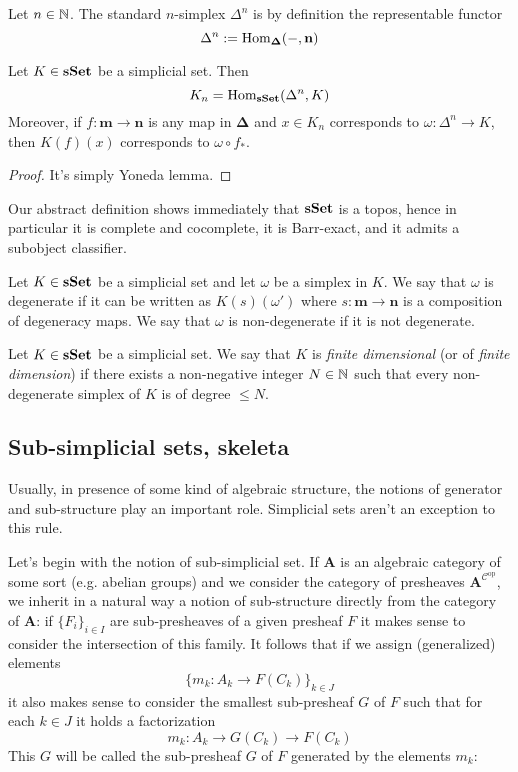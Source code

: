 \begin{defin}
Let $n \in \mathbb{N}$. The standard $n$-simplex $\Delta^n$ is by definition the representable functor
\[
\Delta^n := \mathrm{Hom}_{\mathbf \Delta}(-,\mathbf n)
\]
\end{defin}

\begin{prop} \label{prop simplicial morphisms with Yoneda identification}
Let $K \in \mathbf{sSet}$ be a simplicial set. Then
\[
K_n = \mathrm{Hom}_{\mathbf{sSet}}(\Delta^n,K)
\]
Moreover, if $f \colon \mathbf m \to \mathbf n$ is any map in $\mathbf \Delta$ and $x \in K_n$ corresponds to $\omega \colon \Delta^n \to K$, then $K(f)(x)$ corresponds to $\omega \circ f_*$.
\end{prop}

\begin{proof}
It's simply Yoneda lemma.
\end{proof}

Our abstract definition shows immediately that $\mathbf{sSet}$ is a topos, hence in particular it is complete and cocomplete, it is Barr-exact, and it admits a subobject classifier. 

\begin{defin}
Let $K \in \mathbf{sSet}$ be a simplicial set and let $\omega$ be a simplex in $K$. We say that $\omega$ is degenerate if it can be written as $K(s)(\omega')$ where $s \colon \mathbf m \to \mathbf n$ is a composition of degeneracy maps. We say that $\omega$ is non-degenerate if it is not degenerate.
\end{defin}

\begin{defin} \label{def simplicial set of finite dimension}
Let $K \in \mathbf{sSet}$ be a simplicial set. We say that $K$ is \emph{finite dimensional} (or of \emph{finite dimension}) if there exists a non-negative integer $N \in \mathbb{N}$ such that every non-degenerate simplex of $K$ is of degree $\le N$.
\end{defin}

\subsection{Sub-simplicial sets, skeleta}

Usually, in presence of some kind of algebraic structure, the notions of generator and sub-structure play an important role. Simplicial sets aren't an exception to this rule.

Let's begin with the notion of sub-simplicial set. If $\mathbf A$ is an algebraic category of some sort (e.g. abelian groups) and we consider the category of presheaves $\mathbf A^{\mathcal C^\mathrm{op}}$, we inherit in a natural way a notion of sub-structure directly from the category of $\mathbf A$: if $\{F_i\}_{i \in I}$ are sub-presheaves of a given presheaf $F$ it makes sense to consider the intersection of this family. It follows that if we assign (generalized) elements
\[
\{m_k \colon A_k \to F(C_k)\}_{k \in J}
\]
it also makes sense to consider the smallest sub-presheaf $G$ of $F$ such that for each $k \in J$ it holds a factorization
\[
m_k \colon A_k \to G(C_k) \to F(C_k)
\]
This $G$ will be called the sub-presheaf $G$ of $F$ generated by the elements $m_k$:


